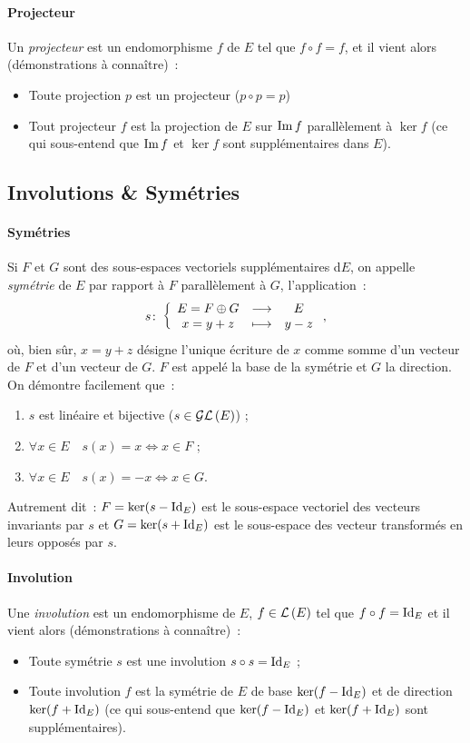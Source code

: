 \paragraph{Projecteur}
Un \emph{projecteur} est un endomorphisme $f$ de $E$ tel que $f \circ f = f$, et il vient alors (démonstrations à connaître)~:
\begin{itemize}
	\item Toute projection $p$ est un projecteur ($p \circ p = p$)
	\item Tout projecteur $f$ est la projection de $E$ sur $\operatorname{Im}{f}$ parallèlement à $\ker{f}$ (ce qui sous-entend que $\operatorname{Im}{f}$ et $\ker{f}$ sont supplémentaires dans $E$).
\end{itemize}
\subsection{Involutions \& Symétries}
\label{chap0-subsec:involutionssymetries}
\paragraph{Symétries}
Si $F$ et $G$ sont des sous-espaces vectoriels supplémentaires d$E$, on appelle \emph{symétrie} de $E$ par rapport à $F$ parallèlement à $G$, l'application~:
\begin{equation}
	s\colon \left\{\begin{array}{ccc} E = F \oplus G & \longrightarrow &E\\ x=y+z & \longmapsto & y-z \end{array} \right.,
\end{equation}
où, bien sûr, $x=y+z$ désigne l'unique écriture de $x$ comme somme d'un vecteur de $F$ et d'un vecteur de $G$. $F$ est appelé la base de la symétrie et $G$ la direction. On démontre facilement que~:
\begin{enumerate}
	\item $s$ est linéaire et bijective ($s \in \mathcal{GL}\left(E\right)$) ;
	\item $\forall x \in E \quad s(x)=x \iff x \in F$ ;
	\item $\forall x \in E \quad s(x)=-x \iff x \in G$.
\end{enumerate}
Autrement dit~: $F=\ker(s-\operatorname{Id}_E)$ est le sous-espace vectoriel des vecteurs  invariants par $s$ et $G=\ker(s+\operatorname{Id}_E)$ est le sous-espace des vecteur transformés en leurs opposés par $s$.
\paragraph{Involution}
Une \emph{involution} est un endomorphisme de $E$, $f \in \mathcal{L}\left(E\right)$ tel que $f\circ f = \operatorname{Id}_E$ et il vient alors (démonstrations à connaître)~:
\begin{itemize}
	\item Toute symétrie $s$ est une involution $s \circ s = \operatorname{Id}_E$ ;
	\item Toute involution $f$ est la symétrie de $E$ de base $\ker(f-\operatorname{Id}_E)$ et de direction $\ker(f+\operatorname{Id}_E)$ (ce qui sous-entend que $\ker(f-\operatorname{Id}_E)$ et $\ker(f+\operatorname{Id}_E)$ sont supplémentaires).
\end{itemize}
